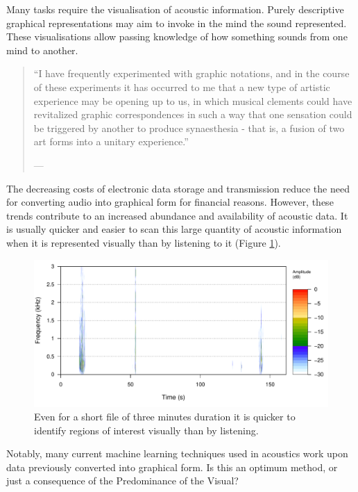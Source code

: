 \documentclass[
]{book}
\begin{document}
Many tasks require the visualisation of acoustic information. Purely descriptive graphical representations may aim to invoke in the mind the sound represented. These visualisations allow passing knowledge of how something sounds from one mind to another.

\begin{quote}
``I have frequently experimented with graphic notations, and in the course of these experiments it has occurred to me that a new type of artistic experience may be opening up to us, in which musical clements could have revitalized graphic correspondences in such a way that one sensation could be triggered by another to produce synaesthesia - that is, a fusion of two art forms into a unitary experience.''

\hfill --- \citep{schafer1975}
\end{quote}

The decreasing costs of electronic data storage and transmission reduce the need for converting audio into graphical form for financial reasons. However, these trends contribute to an increased abundance and availability of acoustic data. It is usually quicker and easier to scan this large quantity of acoustic information when it is represented visually than by listening to it (Figure \ref{fig:quicker-visually}).

\begin{figure}

{\centering \includegraphics[width=0.9\linewidth]{_main_files/figure-latex/quicker-visually-1} 

}

\caption{Even for a short file of three minutes duration it is quicker to identify regions of interest visually than by listening.}\label{fig:quicker-visually}
\end{figure}

Notably, many current machine learning techniques used in acoustics work upon data previously converted into graphical form. Is this an optimum method, or just a consequence of the Predominance of the Visual?
\end{document}
